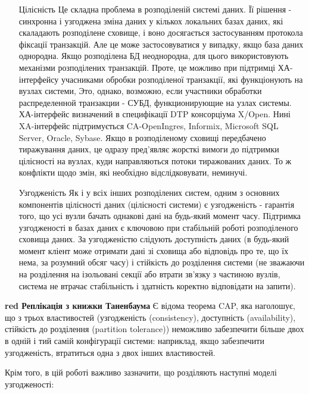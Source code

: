 \documentclass[14pt]{vakthesis}
\begin{document}
\begin{itemize}
\item[Цілісність] Це складна проблема в розподіленій системі даних. Її рішення - синхронна і узгоджена зміна даних у кількох локальних базах даних, які скаладають розподілене сховище, і воно досягається застосуванням протокола фіксації транзакцій. Але це може застосовуватися у випадку, якщо база даних однородна. Якщо розподілена БД неоднородна, для цього використовують механізми розподілених транзакцій. Проте, це можливо при підтримці ХА-інтерфейсу учасниками обробки розподіленої транзакції, які функціонують на вузлах системи,   Это, однако, возможно, если участники обработки распределенной транзакции - СУБД, функционирующие на узлах системы. ХА-інтерфейс визначений в специфікації DTP консорціума X/Open. Нині XA-інтерфейс підтримується CA-OpenIngres, Informix, Microsoft SQL Server, Oracle, Sybase.
Якщо в розподіленому сховищі передбачено тиражування даних, це одразу пред'являє жорсткі  вимоги до підтримки цілісності на вузлах, куди направляються потоки тиражованих даних. То ж конфлікти щодо змін, які необхідно відслідковувати, неминучі. 
\item[Узгодженість] Як і у всіх інших розподілених систем, одним з основних компонентів цілісності даних (цілісності системи) є узгодженість - гарантія того, що усі вузли бачать однакові дані на будь-який момент часу.
Підтримка узгодженості в базах даних є ключовою при стабільній роботі розподіленого сховища даних. 
За узгодженістю слідують доступність даних (в будь-який момент кліент може отримати дані зі сховища або відповідь про те, що їх нема, за розумний обсяг часу) і стійкість до розділення системи (не зважаючи на розділення на ізольовані секції або втрати зв'язку з частиною вузлів, система не втрачає стабільність і здатність коректно відповідати на запити).

\end{itemize}



{\bfseries{red} Реплікація з книжки Таненбаума}
Є відома теорема CAP, яка наголошує, що з трьох властивостей (узгодженість (consistency), доступність (availability), стійкість до розділення (partition tolerance)) неможливо забезпечити більше двох в одній і тий самій конфігурації системи: наприклад, якщо забезпечити узгодженість, втратиться одна з двох інших властивостей. 

Крім того, в цій роботі важливо зазначити, що розділяють наступні моделі узгодженості:
\end{document}
